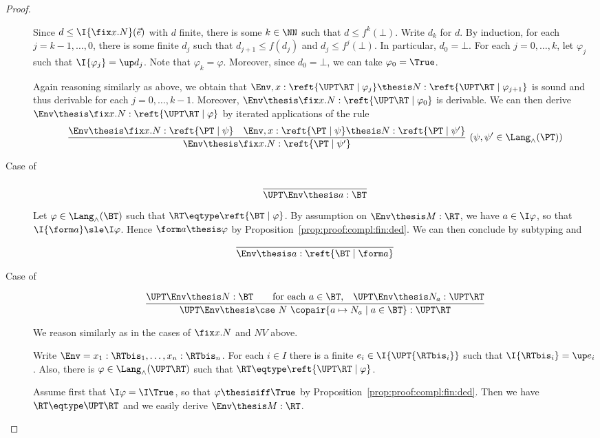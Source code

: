 \begin{proof}
\begin{description}
Since $d \leq \I{\fix x.N}(\vec e)$ with $d$ finite,
there is some $k \in \NN$
such that
$d \leq f^k(\bot)$.
Write $d_k$ for $d$.
By induction, for each $j = k-1,\dots,0$,
there is some finite $d_j$ such that 
$d_{j+1} \leq f(d_j)$
and
$d_j \leq f^{j}(\bot)$.
In particular, $d_0 = \bot$.
For each $j = 0,\dots,k$,
let $\varphi_j$ such that $\I{\varphi_j} = \up d_j$.
Note that $\varphi_k = \varphi$.
Moreover, since $d_0 = \bot$,
we can take $\varphi_0 = \True$.

Again reasoning similarly as above,
we obtain that 
$\Env, x : \reft{\UPT\RT \mid \varphi_j} \thesis N : \reft{\UPT\RT \mid \varphi_{j+1}}$
is sound and thus derivable for each $j = 0,\dots,k-1$.
Moreover,
$\Env \thesis \fix x.N : \reft{\UPT\RT \mid \varphi_0}$
is derivable.
We can then derive $\Env \thesis \fix x.N : \reft{\UPT\RT \mid \varphi}$
by iterated applications of the rule
\[
\dfrac{\Env \thesis \fix x.N : \reft{\PT \mid \psi}
  \quad
  \Env, x: \reft{\PT \mid \psi} \thesis N : \reft{\PT \mid \psi'}}
  {\Env \thesis \fix x.N : \reft{\PT \mid \psi'}}
~(\psi,\psi' \in \Lang_\land(\PT))
\]

\item[Case of]
\[
\dfrac{}
  {\UPT\Env \thesis a : \BT}
\]

Let $\varphi \in \Lang_\land(\BT)$ such that $\RT \eqtype \reft{\BT \mid \varphi}$.
By assumption on $\Env \thesis M :\RT$,
we have $a \in \I\varphi$,
so that $\I{\form a} \sle \I\varphi$.
Hence $\form a \thesis \varphi$
by Proposition~\ref{prop:proof:compl:fin:ded}.
We can then conclude by subtyping and
\[
\dfrac{}
  {\Env \thesis a : \reft{\BT \mid \form a}}
\]

\item[Case of]
\[
\dfrac{ \UPT\Env \thesis N : \BT
  \qquad\text{for each $a \in \BT$,\quad} \UPT\Env \thesis N_a : \UPT\RT}
  {\UPT\Env \thesis \cse\ N\ \copair{a \mapsto N_a \mid a \in \BT} : \UPT\RT}
\]

We reason similarly as in the cases of $\fix x.N$ and $N V$ above.

Write $\Env = x_1:\RTbis_1,\dots,x_n:\RTbis_n$.
For each $i \in I$
there is a finite $e_i \in \I{\UPT{\RTbis_i}}$
such that $\I{\RTbis_i} = \up e_i$.
Also, there is $\varphi \in \Lang_\land(\UPT\RT)$
such that $\RT \eqtype \reft{\UPT\RT \mid \varphi}$.

Assume first that $\I\varphi = \I\True$,
so that $\varphi \thesisiff \True$
by Proposition~\ref{prop:proof:compl:fin:ded}.
Then we have $\RT \eqtype \UPT\RT$ and we easily
derive $\Env \thesis M : \RT$.


\end{description}
\end{proof}
